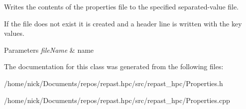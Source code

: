 Writes the contents of the properties file to the specified separated-\/value file. 

If the file does not exist it is created and a header line is written with the key values.


\begin{DoxyParams}{Parameters}
{\em file\-Name} & name \\
\hline
\end{DoxyParams}


The documentation for this class was generated from the following files\-:\begin{DoxyCompactItemize}
\item 
/home/nick/\-Documents/repos/repast.\-hpc/src/repast\-\_\-hpc/Properties.\-h\item 
/home/nick/\-Documents/repos/repast.\-hpc/src/repast\-\_\-hpc/Properties.\-cpp\end{DoxyCompactItemize}
